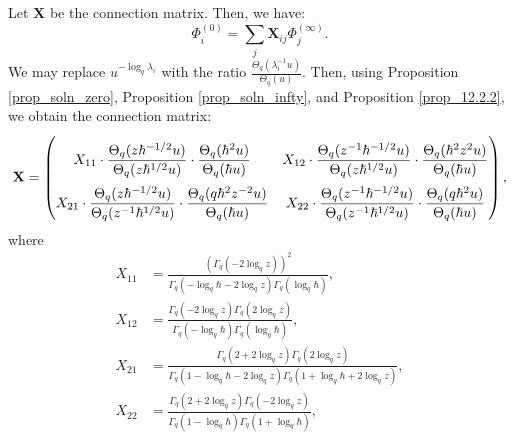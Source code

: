 \documentclass[a4paper]{report}
\theoremstyle{theorem}
\theoremstyle{definition}
\theoremstyle{remark}
\theoremstyle{proposition}
\theoremstyle{conjecture}
\theoremstyle{lemma}
\theoremstyle{corollary}
\theoremstyle{exercise}
\theoremstyle{example}
\begin{document}
  Let $\mathbf{X}$ be the connection matrix. Then, we have: 
  $$\Phi^{(0)}_i = \sum_j \mathbf{X}_{ij} \Phi^{(\infty)}_j.$$
  We may replace $u^{-\log_q\lambda_i}$ with the ratio $\frac{\Theta_q(\lambda_i^{-1}u)}{\Theta_q(u)}$. 
  Then, using Proposition \ref{prop_soln_zero}, Proposition \ref{prop_soln_infty}, and 
  Proposition \ref{prop_12.2.2}, we obtain the connection matrix:
  $$\mathbf{X} = \renewcommand\arraystretch{2.5}\begin{pmatrix}
      X_{11} \cdot \displaystyle\frac{\Theta_q(z\hbar^{-1/2}u)}{\Theta_q(z\hbar^{1/2}u)} \cdot \frac{\Theta_q(\hbar^2u)}{\Theta_q(\hbar u)} & X_{12} \cdot \displaystyle\frac{\Theta_q(z^{-1}\hbar^{-1/2}u)}{\Theta_q(z\hbar^{1/2}u)} \cdot \displaystyle\frac{\Theta_q(\hbar^2z^2u)}{\Theta_q(\hbar u)}\\
      X_{21} \cdot \displaystyle\frac{\Theta_q(z\hbar^{-1/2}u)}{\Theta_q(z^{-1}\hbar^{1/2}u)}\cdot \displaystyle\frac{\Theta_q(q\hbar^2z^{-2}u)}{\Theta_q(\hbar u)} & X_{22} \cdot \displaystyle\frac{\Theta_q(z^{-1}\hbar^{-1/2}u)}{\Theta_q(z^{-1}\hbar^{1/2}u)} \cdot \frac{\Theta_q(q\hbar^2u)}{\Theta_q(\hbar u)}
  \end{pmatrix},$$
  where 
  \begin{align*}
      X_{11} &= \frac{\left(\Gamma_q(-2\log_qz)\right)^2}{\Gamma_q(-\log_q\hbar - 2\log_qz)\Gamma_q(\log_q\hbar)},\\
      X_{12} &= \frac{\Gamma_q(-2\log_qz)\Gamma_q(2\log_qz)}{\Gamma_q(-\log_q\hbar) \Gamma_q(\log_q\hbar)},\\
      X_{21} &= \frac{\Gamma_q(2+2\log_qz) \Gamma_q(2\log_qz)}{\Gamma_q(1-\log_q\hbar - 2\log_qz) \Gamma_q(1 + \log_q\hbar + 2\log_qz)},\\ 
      X_{22} &= \frac{\Gamma_q(2 + 2\log_qz)\Gamma_q(-2\log_qz)}{\Gamma_q(1-\log_q\hbar) \Gamma_q(1 + \log_q\hbar)},
  \end{align*}
\end{document}
